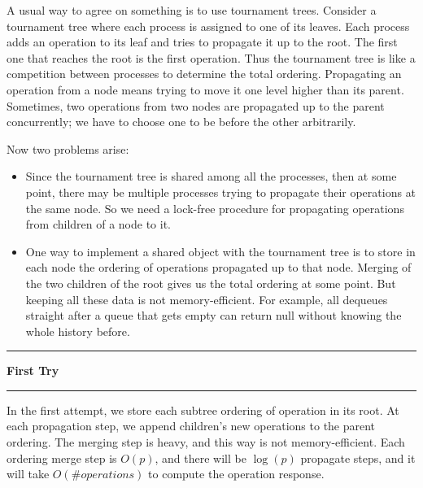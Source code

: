\documentclass[10pt,table]{article}
\newcommand\question[1]{\vspace{1.2em}\hrule\textbf{ #1}\vspace{.5em}\hrule}
\theoremstyle{definition}
\begin{document}
A usual way \cite{JayantiP05} to agree on something is to use tournament trees. Consider a tournament tree where each process is assigned to one of its leaves. Each process adds an operation to its leaf and tries to propagate it up to the root. The first one that reaches the root is the first operation. Thus the tournament tree is like a competition between processes to determine the total ordering. Propagating an operation from a node means trying to move it one level higher than its parent. Sometimes, two operations from two nodes are propagated up to the parent concurrently; we have to choose one to be before the other arbitrarily.

Now two problems arise:
\begin{itemize}
  \item Since the tournament tree is shared among all the processes, then at some point, there may be multiple processes trying to propagate their operations at the same node. So we need a lock-free procedure for propagating operations from children of a node to it.
  \item One way to implement a shared object with the tournament tree is to store in each node the ordering of operations propagated up to that node. Merging of the two children of the root gives us the total ordering at some point. But keeping all these data is not memory-efficient. For example, all dequeues straight after a queue that gets empty can return null without knowing the whole history before.
\end{itemize} 
\pagebreak
\question{First Try}

In the first attempt, we store each subtree ordering of operation in its root. At each propagation step, we append children's new operations to the parent ordering.  The merging step is heavy, and this way is not memory-efficient. Each ordering merge step is $O(p)$, and there will be $\log(p)$ propagate steps, and it will take $O(\#operations)$ to compute the operation response.
\end{document}
